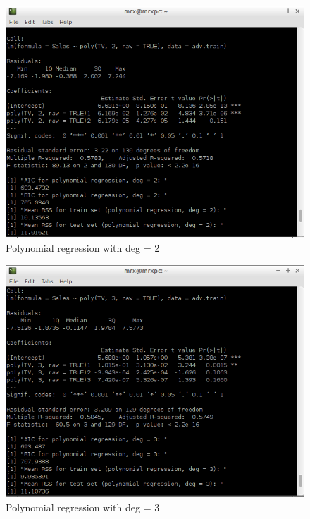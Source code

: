 \documentclass[10pt,a4paper]{article}
\begin{document}
\begin{figure}[H]
\centering
\includegraphics[width=140mm]{figures2/poly2.png}
\caption{Polynomial regression with deg = 2 \label{overflow}}
\end{figure}

\begin{figure}[H]
\centering
\includegraphics[width=140mm]{figures2/poly3.png}
\caption{Polynomial regression with deg = 3 \label{overflow}}
\end{figure}
\end{document}
